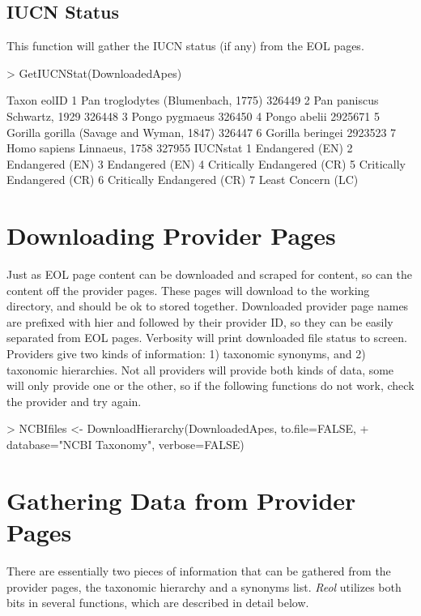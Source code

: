 \documentclass[12pt]{article}
\begin{document}
\subsection{IUCN Status}
This function will gather the IUCN status (if any) from the EOL pages.

\begin{Schunk}
\begin{Sinput}
> GetIUCNStat(DownloadedApes)
\end{Sinput}
\begin{Soutput}
                                     Taxon   eolID
1       Pan troglodytes (Blumenbach, 1775)  326449
2              Pan paniscus Schwartz, 1929  326448
3                           Pongo pygmaeus  326450
4                             Pongo abelii 2925671
5 Gorilla gorilla (Savage and Wyman, 1847)  326447
6                         Gorilla beringei 2923523
7              Homo sapiens Linnaeus, 1758  327955
                    IUCNstat
1            Endangered (EN)
2            Endangered (EN)
3            Endangered (EN)
4 Critically Endangered (CR)
5 Critically Endangered (CR)
6 Critically Endangered (CR)
7         Least Concern (LC)
\end{Soutput}
\end{Schunk}

\section{Downloading Provider Pages}
Just as EOL page content can be downloaded and scraped for content, so can the content off the provider pages. These pages will download to the working directory, and should be ok to stored together. Downloaded provider page names are prefixed with hier and followed by their provider ID, so they can be easily separated from EOL pages. Verbosity will print downloaded file status to screen. Providers give two kinds of information: 1) taxonomic synonyms, and 2) taxonomic hierarchies. Not all providers will provide both kinds of data, some will only provide one or the other, so if the following functions do not work, check the provider and try again. 

\begin{Schunk}
\begin{Sinput}
> NCBIfiles <- DownloadHierarchy(DownloadedApes, to.file=FALSE, 
+ 	database="NCBI Taxonomy", verbose=FALSE)
\end{Sinput}
\end{Schunk}

\section{Gathering Data from Provider Pages}
There are essentially two pieces of information that can be gathered from the provider pages, the taxonomic hierarchy and a synonyms list. \textit{Reol} utilizes both bits in several functions, which are described in detail below. 
\end{document}
